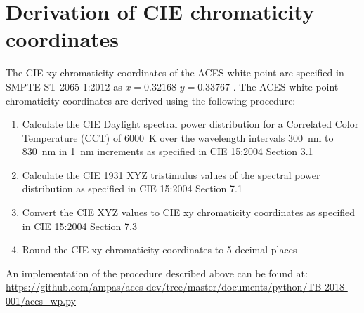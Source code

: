 \newpage
\regularsectionformat
\chapter{Derivation of CIE chromaticity coordinates}
\label{chap:dervation}

The CIE xy chromaticity coordinates of the ACES white point are specified in SMPTE ST 2065-1:2012 as $x=0.32168$ $y=0.33767$ \cite{SMPTE20651}. The ACES white point chromaticity coordinates are derived using the following procedure:

\begin{enumerate}
    \item Calculate the CIE Daylight spectral power distribution for a Correlated Color Temperature (CCT) of \SI[mode=text]{6000}{\kelvin} over the wavelength intervals \SI[mode=text]{300}{\nm} to \SI[mode=text]{830}{\nm} in \SI[mode=text]{1}{\nm} increments as specified in CIE 15:2004 Section 3.1 \cite{CIE152004}
    \item Calculate the CIE 1931 XYZ tristimulus values of the spectral power distribution as specified in CIE 15:2004 Section 7.1 \cite{CIE152004}
    \item Convert the CIE XYZ values to CIE xy chromaticity coordinates as specified in CIE 15:2004 Section 7.3 \cite{CIE152004}
    \item Round the CIE xy chromaticity coordinates to 5 decimal places
\end{enumerate}

An implementation of the procedure described above can be found at: \\ \url{https://github.com/ampas/aces-dev/tree/master/documents/python/TB-2018-001/aces_wp.py}